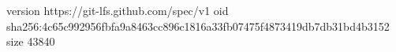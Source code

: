 version https://git-lfs.github.com/spec/v1
oid sha256:4c65c992956fbfa9a8463cc896c1816a33fb07475f4873419db7db31bd4b3152
size 43840
